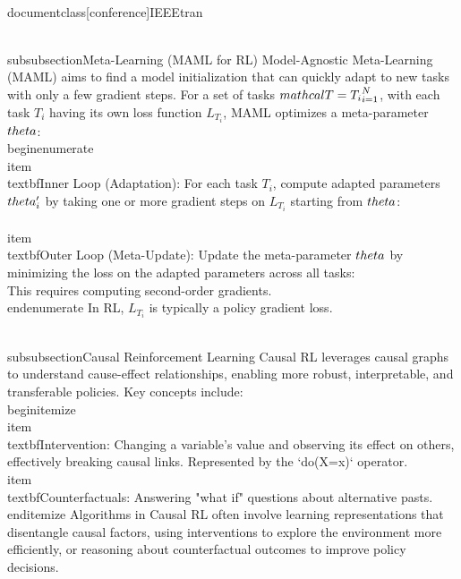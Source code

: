 \\documentclass[conference]{IEEEtran}
\begin{document}
\\subsubsection{Meta-Learning (MAML for RL)}
Model-Agnostic Meta-Learning (MAML) aims to find a model initialization that can quickly adapt to new tasks with only a few gradient steps.
For a set of tasks $\\mathcal{T} = \\{T_i\\}_{i=1}^N$, with each task $T_i$ having its own loss function $L_{T_i}$, MAML optimizes a meta-parameter $\\theta$:
\\begin{enumerate}
    \\item \\textbf{Inner Loop (Adaptation):} For each task $T_i$, compute adapted parameters $\\theta'_i$ by taking one or more gradient steps on $L_{T_i}$ starting from $\\theta$:
    \\[
    \\theta'_i = \\theta - \\alpha \\nabla_{\\theta} L_{T_i}(\\theta)
    \\]
    \\item \\textbf{Outer Loop (Meta-Update):} Update the meta-parameter $\\theta$ by minimizing the loss on the adapted parameters across all tasks:
    \\[
    \\min_{\\theta} \\sum_{T_i \\sim \\mathcal{T}} L_{T_i}(\\theta'_i)
    \\]
    This requires computing second-order gradients.
\\end{enumerate}
In RL, $L_{T_i}$ is typically a policy gradient loss.

\\subsubsection{Causal Reinforcement Learning}
Causal RL leverages causal graphs to understand cause-effect relationships, enabling more robust, interpretable, and transferable policies. Key concepts include:
\\begin{itemize}
    \\item \\textbf{Intervention:} Changing a variable's value and observing its effect on others, effectively breaking causal links. Represented by the `do(X=x)` operator.
    \\item \\textbf{Counterfactuals:} Answering "what if" questions about alternative pasts.
\\end{itemize}
Algorithms in Causal RL often involve learning representations that disentangle causal factors, using interventions to explore the environment more efficiently, or reasoning about counterfactual outcomes to improve policy decisions.
\end{document}
